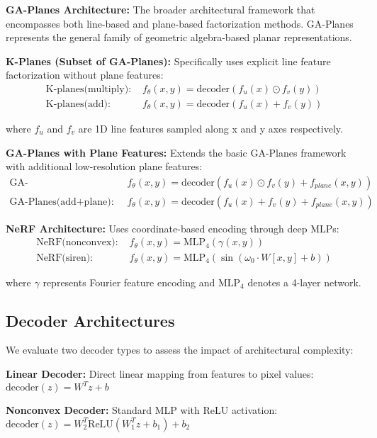 \documentclass{article}
\begin{document}
\textbf{GA-Planes Architecture:} The broader architectural framework that encompasses both line-based and plane-based factorization methods. GA-Planes represents the general family of geometric algebra-based planar representations.

\textbf{K-Planes (Subset of GA-Planes):} Specifically uses explicit line feature factorization without plane features:
\begin{align}
\text{K-planes(multiply): } &f_\theta(x,y) = \text{decoder}(f_u(x) \odot f_v(y)) \\
\text{K-planes(add): } &f_\theta(x,y) = \text{decoder}(f_u(x) + f_v(y))
\end{align}

where $f_u$ and $f_v$ are 1D line features sampled along x and y axes respectively.

\textbf{GA-Planes with Plane Features:} Extends the basic GA-Planes framework with additional low-resolution plane features:
\begin{align}
\text{GA-Planes(multiply+plane): } &f_\theta(x,y) = \text{decoder}(f_u(x) \odot f_v(y) + f_{plane}(x,y)) \\
\text{GA-Planes(add+plane): } &f_\theta(x,y) = \text{decoder}(f_u(x) + f_v(y) + f_{plane}(x,y))
\end{align}

\textbf{NeRF Architecture:} Uses coordinate-based encoding through deep MLPs:
\begin{align}
\text{NeRF(nonconvex): } &f_\theta(x,y) = \text{MLP}_4(\gamma(x,y)) \\
\text{NeRF(siren): } &f_\theta(x,y) = \text{MLP}_4(\sin(\omega_0 \cdot W[x,y] + b))
\end{align}

where $\gamma$ represents Fourier feature encoding and $\text{MLP}_4$ denotes a 4-layer network.

\subsection{Decoder Architectures}

We evaluate two decoder types to assess the impact of architectural complexity:

\textbf{Linear Decoder:} Direct linear mapping from features to pixel values:
$\text{decoder}(z) = W^T z + b$

\textbf{Nonconvex Decoder:} Standard MLP with ReLU activation:
$\text{decoder}(z) = W_2^T \text{ReLU}(W_1^T z + b_1) + b_2$
\end{document}

